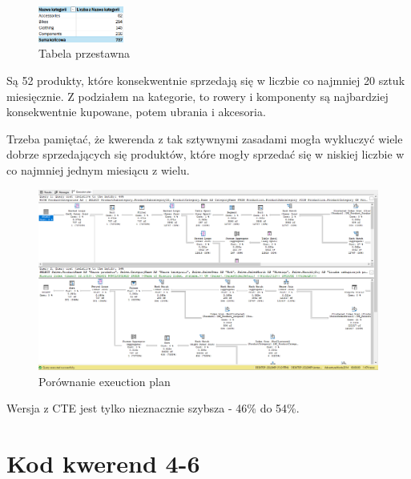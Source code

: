 \documentclass[a4paper,12pt]{article}
\begin{document}
\begin{figure}[H]
	\centering
	\includegraphics[width=0.25\textwidth]{images/3_excel.png}
	\caption{Tabela przestawna}
\end{figure}

Są 52 produkty, które konsekwentnie sprzedają się w liczbie co najmniej 20 sztuk miesięcznie. Z podziałem na kategorie, to rowery i komponenty są najbardziej konsekwentnie kupowane, potem ubrania i akcesoria.

Trzeba pamiętać, że kwerenda z tak sztywnymi zasadami mogła wykluczyć wiele dobrze sprzedających się produktów, które mogły sprzedać się w niskiej liczbie w co najmniej jednym miesiącu z wielu.

\begin{figure}[H]
	\centering
	\includegraphics[width=1.0\textwidth]{images/3_execution_plan.png}
	\caption{Porównanie exeuction plan}
\end{figure}

Wersja z CTE jest tylko nieznacznie szybsza - 46\% do 54\%.

\section{Kod kwerend 4-6}
\end{document}
